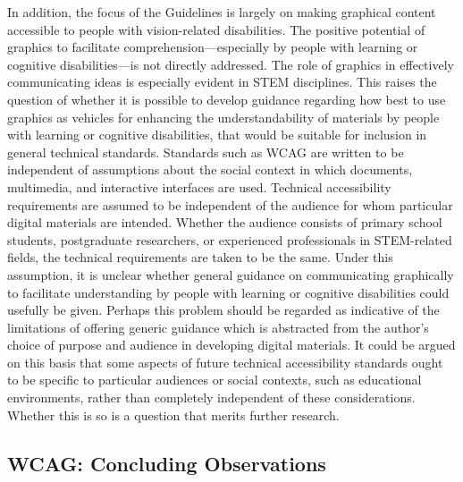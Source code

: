 \documentclass{sig-alternate} %
\begin{document}
\begin{large}
In addition, the focus of the Guidelines is largely on making graphical content accessible to people with vision-related disabilities. The positive potential of graphics to facilitate comprehension—especially by people with learning or cognitive disabilities—is not directly addressed. The role of graphics in effectively communicating ideas is especially evident in STEM disciplines. This raises the question of whether it is possible to develop guidance regarding how best to use graphics as vehicles for enhancing the understandability of materials by people with learning or cognitive disabilities, that would be suitable for inclusion in general technical standards. Standards such as WCAG are written to be independent of assumptions about the social context in which documents, multimedia, and interactive interfaces are used. Technical accessibility requirements are assumed to be independent of the audience for whom particular digital materials are intended. Whether the audience consists of primary school students, postgraduate researchers, or experienced professionals in STEM-related fields, the technical requirements are taken to be the same. Under this assumption, it is unclear whether general guidance on communicating graphically to facilitate understanding by people with learning or cognitive disabilities could usefully be given. Perhaps this problem should be regarded as indicative of the limitations of offering generic guidance which is abstracted from the author’s choice of purpose and audience in developing digital materials. It could be argued on this basis that some aspects of future technical accessibility standards ought to be specific to particular audiences or social contexts, such as educational environments, rather than completely independent of these considerations. Whether this is so is a question that merits further research.

\subsection*{WCAG: Concluding Observations}


\end{large}
\end{document}
